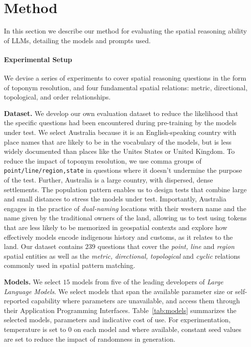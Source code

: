 \section{Method}
\label{section:method}

In this section we describe our method for evaluating the spatial reasoning ability of LLMs, detailing the models and prompts used.


\paragraph{Experimental Setup}
We devise a series of experiments to cover spatial reasoning questions in the form of toponym resolution, and four fundamental spatial relations: metric, directional, topological, and order relationships.



\textbf{Dataset.} 
We develop our own evaluation dataset to reduce the likelihood that the specific questions had been encountered during pre-training by the models under test. 
We select Australia because it is an English-speaking country with place names that are likely to be in the vocabulary of the models, but is less widely documented than places like the Unites States or United Kingdom. 
To reduce the impact of toponym resolution, we use comma groups of \texttt{point/line/region,state} in questions where it doesn't undermine the purpose of the test.
Further, Australia is a large country, with dispersed, dense settlements. 
The population pattern enables us to design tests that combine large and small distances to stress the models under test. 
Importantly, Australia engages in the practice of \textit{dual-naming} locations with their western name and the name given by the traditional owners of the land, allowing us to test using tokens that are less likely to be memorized in geospatial contexts and explore how effectively models encode indigenous history and customs, as it relates to the land.
Our dataset contains $239$ questions that cover the \textit{point, line} and \textit{region} spatial entities as well as the \textit{metric, directional, topological} and \textit{cyclic} relations commonly used in spatial pattern matching.

\textbf{Models.}
We select $15$ models from five of the leading developers of \textit{Large Language Models}. 
We select models that span the available parameter size or self-reported capability where parameters are unavailable, and access them through their Application Programming Interfaces. 
Table~\ref{tab:models} summarizes the selected models, parameters and indicative cost of use. 
For experimentation, temperature is set to $0$ on each model and where available, constant seed values are set to reduce the impact of randomness in generation.

